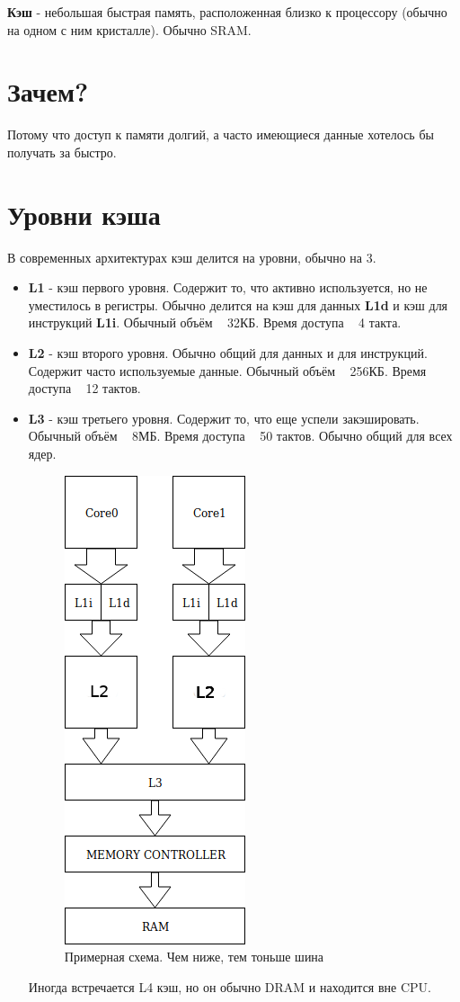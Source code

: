 \documentclass[12pt, a4paper]{article}
\begin{document}
\textbf{Кэш} - небольшая быстрая память, расположенная близко к процессору (обычно на одном с ним кристалле). Обычно SRAM.
\section{Зачем?}
Потому что доступ к памяти долгий, а часто имеющиеся данные хотелось бы получать за быстро.
\section{Уровни кэша}
В современных архитектурах кэш делится на уровни, обычно на 3.
\begin{itemize}
    \item \textbf{L1} - кэш первого уровня. Содержит то, что активно используется, но не уместилось в регистры. Обычно делится на кэш для данных \textbf{L1d} и кэш для инструкций \textbf{L1i}. Обычный объём ~ 32КБ. Время доступа ~ 4 такта.
    \item \textbf{L2} - кэш второго уровня. Обычно общий для данных и для инструкций. Содержит часто используемые данные. Обычный объём ~ 256КБ. Время доступа ~ 12 тактов.
    \item \textbf{L3} - кэш третьего уровня. Содержит то, что еще успели закэшировать. Обычный объём ~ 8МБ. Время доступа ~ 50 тактов. Обычно общий для всех ядер.
    \begin{figure}[ht]
        \centering
        \includegraphics[scale=0.4]{./images/CACHElevels}
        \caption{Примерная схема. Чем ниже, тем тоньше шина}
        \label{fig:CACHElevels}
    \end{figure}
    Иногда встречается L4 кэш, но он обычно DRAM и находится вне CPU.
\end{itemize}
\end{document}
